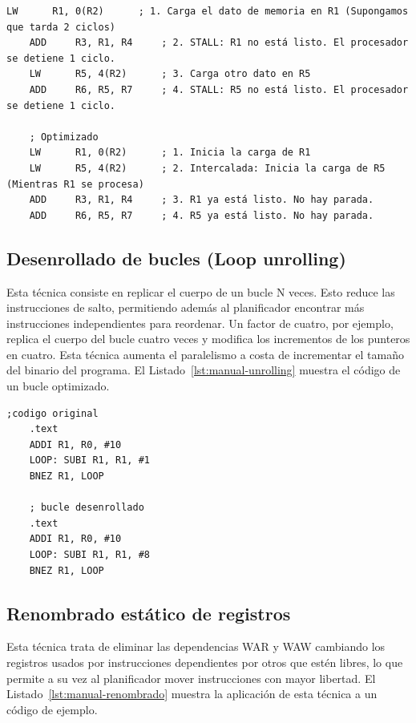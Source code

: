 \documentclass[../main.tex]{subfiles}
\begin{document}
\begin{lstlisting}[caption={Ejemplo de reordenamiento de instrucciones para optimizar un código.},label={lst:manual-scheduling}]
	LW      R1, 0(R2)      ; 1. Carga el dato de memoria en R1 (Supongamos que tarda 2 ciclos)
	ADD     R3, R1, R4     ; 2. STALL: R1 no está listo. El procesador se detiene 1 ciclo.
	LW      R5, 4(R2)      ; 3. Carga otro dato en R5
	ADD     R6, R5, R7     ; 4. STALL: R5 no está listo. El procesador se detiene 1 ciclo.
	
	; Optimizado
	LW      R1, 0(R2)      ; 1. Inicia la carga de R1
	LW      R5, 4(R2)      ; 2. Intercalada: Inicia la carga de R5 (Mientras R1 se procesa)
	ADD     R3, R1, R4     ; 3. R1 ya está listo. No hay parada.
	ADD     R6, R5, R7     ; 4. R5 ya está listo. No hay parada.
\end{lstlisting}

\subsection{Desenrollado de bucles (Loop unrolling)}

Esta técnica consiste en replicar el cuerpo de un bucle N veces. Esto reduce las instrucciones de salto, permitiendo además al planificador encontrar más instrucciones independientes para reordenar. Un factor de cuatro, por ejemplo, replica el cuerpo del bucle cuatro veces y modifica los incrementos de los punteros en cuatro. Esta técnica aumenta el paralelismo a costa de incrementar el tamaño del binario del programa. El Listado~\ref{lst:manual-unrolling} muestra el código de un bucle optimizado.

\begin{lstlisting}[caption={Ejemplo de desenrollado de bucle con factor 8.},label={lst:manual-unrolling}]
	;codigo original
	.text
	ADDI R1, R0, #10
	LOOP: SUBI R1, R1, #1
	BNEZ R1, LOOP
	
	; bucle desenrollado
	.text
	ADDI R1, R0, #10
	LOOP: SUBI R1, R1, #8
	BNEZ R1, LOOP
\end{lstlisting}

\subsection{Renombrado estático de registros}

Esta técnica trata de eliminar las dependencias WAR y WAW cambiando los registros usados por instrucciones dependientes por otros que estén libres, lo que permite a su vez al planificador mover instrucciones con mayor libertad. El Listado~\ref{lst:manual-renombrado} muestra la aplicación de esta técnica a un código de ejemplo.
\end{document}
